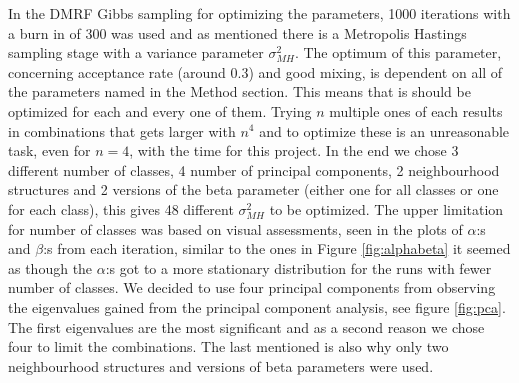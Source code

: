 \documentclass[a4paper,english]{article}
\begin{document}
In the DMRF Gibbs sampling for optimizing the parameters, 1000 iterations with a burn in of 300 was used and as mentioned there is a Metropolis Hastings sampling stage with a variance parameter  $\sigma_{MH}^2$.
The optimum of this parameter, concerning acceptance rate (around $0.3$) and good mixing, is dependent on all of the parameters named in the Method section.
This means that is should be optimized for each and every one of them.
Trying $n$ multiple ones of each results in combinations that gets larger with $n^4$ and to optimize these is an unreasonable task, even for $n=4$, with the time for this project.
In the end we chose 3 different number of classes, 4 number of principal components, 2 neighbourhood structures and 2 versions of the beta parameter (either one for all classes or one for each class), this gives 48 different $\sigma_{MH}^2$ to be optimized.
The upper limitation for number of classes was based on visual assessments, seen in the plots of $\alpha$:s and $\beta$:s from each iteration, similar to the ones in Figure \ref{fig:alphabeta} it seemed as though the $\alpha$:s got to a more stationary distribution for the runs with fewer number of classes.
We decided to use four principal components from observing the eigenvalues gained from the principal component analysis, see figure \ref{fig:pca}. The first eigenvalues are the most significant and as a second reason we chose four to limit the combinations. The last mentioned is also why only two neighbourhood structures and versions of beta parameters were used.
\end{document}
